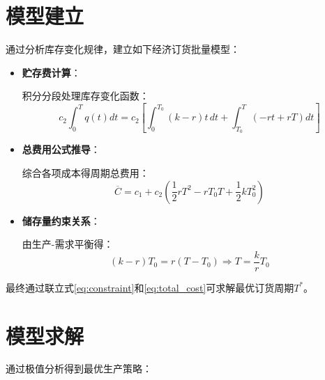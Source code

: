 \section{模型建立}

通过分析库存变化规律，建立如下经济订货批量模型：

\begin{itemize}
    \item \textbf{贮存费计算}：
    
    积分分段处理库存变化函数：
    \begin{equation}\label{eq:storage_cost}
        c_2\int_0^T q(t)dt = c_2\left[ \int_0^{T_0} (k - r)t\,dt + \int_{T_0}^T (-rt + rT)dt \right]
    \end{equation}

    \item \textbf{总费用公式推导}：
    
    综合各项成本得周期总费用：
    \begin{equation}\label{eq:total_cost}
        \overline{C} = c_1 + c_2\left( \frac{1}{2}rT^2 - rT_0T + \frac{1}{2}kT_0^2 \right)
    \end{equation}

    \item \textbf{储存量约束关系}：
    
    由生产-需求平衡得：
    \begin{equation}\label{eq:constraint}
        (k - r)T_0 = r(T - T_0) \Rightarrow T = \frac{k}{r}T_0
    \end{equation}
\end{itemize}

最终通过联立式\eqref{eq:constraint}和\eqref{eq:total_cost}可求解最优订货周期$T^*$。

\section{模型求解}

通过极值分析得到最优生产策略：


